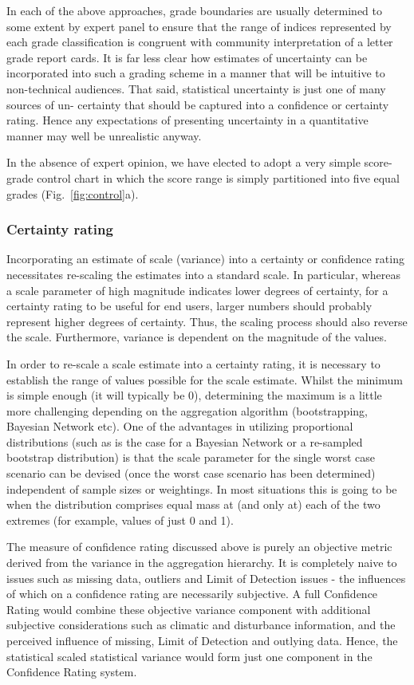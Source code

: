 In each of the above approaches, grade boundaries are usually determined to some extent by expert
panel to ensure that the range of indices represented by each grade classification is congruent with
community interpretation of a letter grade report cards. It is far less clear how estimates of
uncertainty can be incorporated into such a grading scheme in a manner that will be intuitive to
non-technical audiences. That said, statistical uncertainty is just one of many sources of un-
certainty that should be captured into a confidence or certainty rating. Hence any expectations of
presenting uncertainty in a quantitative manner may well be unrealistic anyway.

In the absence of expert opinion, we have elected to adopt a very simple score-grade control chart
in which the score range is simply partitioned into five equal grades (Fig.~\ref{fig:control}a).


\subsubsection{Certainty rating}

Incorporating an estimate of scale (variance) into a certainty or confidence rating necessitates
re-scaling the estimates into a standard scale. In particular, whereas a scale parameter of high
magnitude indicates lower degrees of certainty, for a certainty rating to be useful for end users,
larger numbers should probably represent higher degrees of certainty. Thus, the scaling process
should also reverse the scale. Furthermore, variance is dependent on the magnitude of the values.

In order to re-scale a scale estimate into a certainty rating, it is necessary to establish the
range of values possible for the scale estimate. Whilst the minimum is simple enough (it will
typically be 0), determining the maximum is a little more challenging depending on the aggregation
algorithm (bootstrapping, Bayesian Network etc). One of the advantages in utilizing proportional
distributions (such as is the case for a Bayesian Network or a re-sampled bootstrap distribution) is
that the scale parameter for the single worst case scenario can be devised (once the worst case
scenario has been determined) independent of sample sizes or weightings. In most situations this is
going to be when the distribution comprises equal mass at (and only at) each of the two extremes
(for example, values of just 0 and 1).

The measure of confidence rating discussed above is purely an objective metric derived from the
variance in the aggregation hierarchy. It is completely naive to issues such as missing data,
outliers and Limit of Detection issues - the influences of which on a confidence rating are
necessarily subjective. A full Confidence Rating would combine these objective variance component
with additional subjective considerations such as climatic and disturbance information, and the
perceived influence of missing, Limit of Detection and outlying data. Hence, the statistical scaled
statistical variance would form just one component in the Confidence Rating system.

